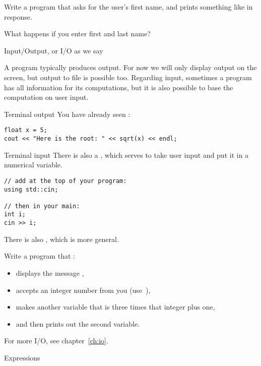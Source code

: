 \begin{exercise}
  \label{ex:ask-for-name}
  Write a program that asks for the user's first name, and prints
  something like  in response.

  What happens if you enter first and last name?
\end{exercise}

 {Input/Output, or I/O as we say}
\label{sec:io}

A program typically produces output. For now we will only display
output on the screen, but output to file is possible too.  Regarding
input, sometimes a program has all information for its computations,
but it is also possible to base the computation on user input.

\begin{block}{Terminal output}
  \label{sl:cout}
You have already seen :
\begin{verbatim}
float x = 5;
cout << "Here is the root: " << sqrt(x) << endl;
\end{verbatim}
\end{block}

\begin{block}{Terminal input}
  \label{sl:cin}
  There is also a , which serves to take user input and
  put it in a numerical variable.
\begin{verbatim}
// add at the top of your program:
using std::cin;

// then in your main:
int i;
cin >> i;
\end{verbatim}
There is also , which is more general.
\end{block}

\begin{exercise}
  \label{ex:cin-cout3np1}
  Write a program that :
  \begin{itemize}
  \item displays the message ,
  \item accepts an integer number from you (use~),
  \item makes another variable that is three times that integer plus one,
  \item and then prints out the second variable.
  \end{itemize}
\end{exercise}

For more I/O, see chapter~\ref{ch:io}.

 {Expressions}
\label{sec:expr}

